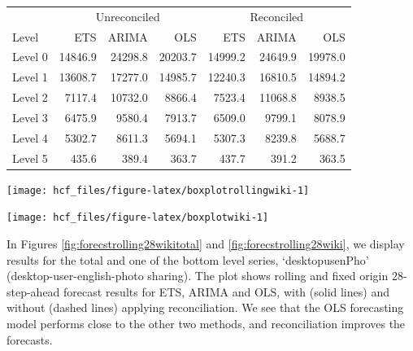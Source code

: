 \documentclass[11pt,a4paper,]{article}
\let\origfigure\figure
\let\endorigfigure\endfigure
\renewenvironment{figure}[1][2] {
    \expandafter\origfigure\expandafter[!htbp]
} {
    \endorigfigure
}
\let\origtable\table
\let\endorigtable\endtable
\renewenvironment{table}[1][2] {
    \expandafter\origtable\expandafter[!htbp]
} {
    \endorigtable
}
\begin{document}
\begin{table}[t]

\caption{\label{tab:wikipediadataresultRMSE}Mean(RMSE) for ETS, ARIMA and OLS with and without reconciliation - Fixed origin 28-step-ahead - Wikipedia dataset}
\centering
\begin{tabular}{lrrrrrr}
\toprule
\multicolumn{1}{c}{} & \multicolumn{3}{c}{Unreconciled} & \multicolumn{3}{c}{Reconciled} \\
\cmidrule(l{2pt}r{2pt}){2-4} \cmidrule(l{2pt}r{2pt}){5-7}
Level & ETS & ARIMA & OLS & ETS & ARIMA & OLS\\
\midrule
Level 0 & 14846.9 & 24298.8 & 20203.7 & 14999.2 & 24649.9 & 19978.0\\
Level 1 & 13608.7 & 17277.0 & 14985.7 & 12240.3 & 16810.5 & 14894.2\\
Level 2 & 7117.4 & 10732.0 & 8866.4 & 7523.4 & 11068.8 & 8938.5\\
Level 3 & 6475.9 & 9580.4 & 7913.7 & 6509.0 & 9799.1 & 8078.9\\
Level 4 & 5302.7 & 8611.3 & 5694.1 & 5307.3 & 8239.8 & 5688.7\\
Level 5 & 435.6 & 389.4 & 363.7 & 437.7 & 391.2 & 363.5\\
\bottomrule
\end{tabular}
\end{table}

\begin{figure}

{\centering \texttt{[image: hcf\_files/figure-latex/boxplotrollingwiki-1]} 

}

\caption{Box plots of forecast errors for reconciled and unreconciled ETS, ARIMA and OLS methods at each hierarchical level for rolling origin 28-step-ahead Wikipedia pageviews.}\label{fig:boxplotrollingwiki}
\end{figure}

\begin{figure}

{\centering \texttt{[image: hcf\_files/figure-latex/boxplotwiki-1]} 

}

\caption{Box plots of forecast errors for reconciled and unreconciled ETS, ARIMA and OLS methods at each hierarchical level for fixed origin 28-step-ahead Wikipedia pageviews.}\label{fig:boxplotwiki}
\end{figure}

In Figures \ref{fig:forecstrolling28wikitotal} and
\ref{fig:forecstrolling28wiki}, we display results for the total and one
of the bottom level series, `desktopusenPho' (desktop-user-english-photo
sharing). The plot shows rolling and fixed origin 28-step-ahead forecast
results for ETS, ARIMA and OLS, with (solid lines) and without (dashed
lines) applying reconciliation. We see that the OLS forecasting model
performs close to the other two methods, and reconciliation improves the
forecasts.
\end{document}
